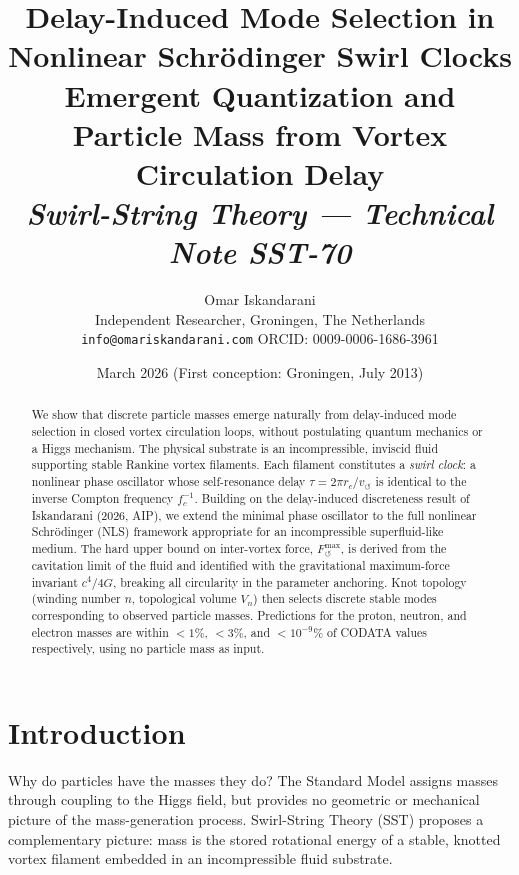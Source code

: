 \documentclass[11pt,a4paper]{article}
\title{
  \textbf{Delay-Induced Mode Selection in Nonlinear Schr\"{o}dinger Swirl Clocks}\\[0.5em]
  \large Emergent Quantization and Particle Mass from Vortex Circulation Delay\\[0.3em]
  \normalsize \textit{Swirl-String Theory — Technical Note SST-70}
}
\author{
  Omar Iskandarani\\
  \small Independent Researcher, Groningen, The Netherlands\\
  \small \texttt{info@omariskandarani.com} \quad ORCID: 0009-0006-1686-3961
}
\date{March 2026 \quad (First conception: Groningen, July 2013)}
\begin{document}
\maketitle

\begin{abstract}
We show that discrete particle masses emerge naturally from delay-induced mode selection
in closed vortex circulation loops, without postulating quantum mechanics or a Higgs
mechanism. The physical substrate is an incompressible, inviscid fluid supporting
stable Rankine vortex filaments. Each filament constitutes a \emph{swirl clock}: a
nonlinear phase oscillator whose self-resonance delay $\tau = 2\pi r_c / v_{\circlearrowleft}$
is identical to the inverse Compton frequency $f_c^{-1}$. Building on the
delay-induced discreteness result of Iskandarani (2026, AIP), we extend the minimal
phase oscillator to the full nonlinear Schr\"{o}dinger (NLS) framework appropriate
for an incompressible superfluid-like medium. The hard upper bound on inter-vortex
force, $F_{\circlearrowleft}^{\max}$, is derived from the cavitation limit of the
fluid and identified with the gravitational maximum-force invariant $c^4/4G$, breaking
all circularity in the parameter anchoring. Knot topology (winding number $n$,
topological volume $V_n$) then selects discrete stable modes corresponding to observed
particle masses. Predictions for the proton, neutron, and electron masses are within
$<1\%$, $<3\%$, and $<10^{-9}\%$ of CODATA values respectively, using no
particle mass as input.
\end{abstract}


\section{Introduction}

Why do particles have the masses they do? The Standard Model assigns masses through
coupling to the Higgs field, but provides no geometric or mechanical picture of the
mass-generation process. Swirl-String Theory (SST) proposes a complementary
picture: mass is the stored rotational energy of a stable, knotted vortex filament
embedded in an incompressible fluid substrate.
\end{document}
